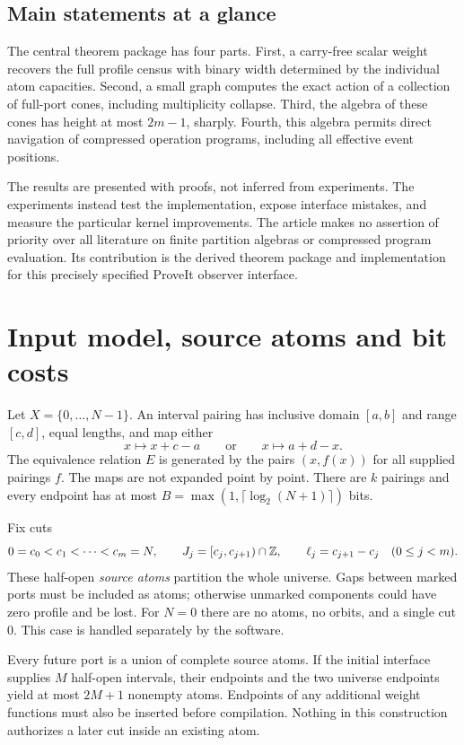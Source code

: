 \subsection{Main statements at a glance}

The central theorem package has four parts. First, a carry-free scalar weight
recovers the full profile census with binary width determined by the
individual atom capacities. Second, a small graph computes the exact action
of a collection of full-port cones, including multiplicity collapse. Third,
the algebra of these cones has height at most $2m-1$, sharply. Fourth, this
algebra permits direct navigation of compressed operation programs, including
all effective event positions.

The results are presented with proofs, not inferred from experiments. The
experiments instead test the implementation, expose interface mistakes, and
measure the particular kernel improvements. The article makes no assertion
of priority over all literature on finite partition algebras or compressed
program evaluation. Its contribution is the derived theorem package and
implementation for this precisely specified ProveIt observer interface.

\section{Input model, source atoms and bit costs}
\label{sec:model}

Let $X=\{0,\ldots,N-1\}$. An interval pairing has inclusive domain $[a,b]$
and range $[c,d]$, equal lengths, and map either
\[
 x\longmapsto x+c-a
 \qquad\text{or}\qquad
 x\longmapsto a+d-x.
\]
The equivalence relation $E$ is generated by the pairs $(x,f(x))$ for all
supplied pairings $f$. The maps are not expanded point by point. There are
$k$ pairings and every endpoint has at most
$B=\max(1,\lceil\log_2(N+1)\rceil)$ bits.

Fix cuts
\[
 0=c_0<c_1<\cdots<c_m=N,
 \qquad J_j=[c_j,c_{j+1})\cap\mathbb Z,
 \qquad \ell_j=c_{j+1}-c_j
 \quad(0\le j<m).
\]
These half-open \emph{source atoms} partition the whole universe. Gaps between
marked ports must be included as atoms; otherwise unmarked components could
have zero profile and be lost. For $N=0$ there are no atoms, no orbits, and a
single cut $0$. This case is handled separately by the software.

Every future port is a union of complete source atoms. If the initial
interface supplies $M$ half-open intervals, their endpoints and the two
universe endpoints yield at most $2M+1$ nonempty atoms. Endpoints of any
additional weight functions must also be inserted before compilation.
Nothing in this construction authorizes a later cut inside an existing atom.


